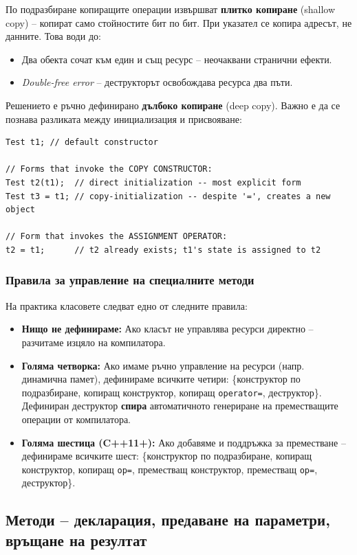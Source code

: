 \documentclass{scrartcl}
\begin{document}
\begin{FlushLeft}
По подразбиране копиращите операции извършват \textbf{плитко копиране} (shallow copy) -- копират само стойностите бит по бит. При указател се копира адресът, не данните. Това води до:
\begin{itemize}
    \item Два обекта сочат към един и същ ресурс -- неочаквани странични ефекти.
    \item \textit{Double-free error} -- деструкторът освобождава ресурса два пъти.
\end{itemize}

Решението е ръчно дефинирано \textbf{дълбоко копиране} (deep copy). Важно е да се познава разликата между инициализация и присвояване:

\begin{lstlisting}
Test t1; // default constructor

// Forms that invoke the COPY CONSTRUCTOR:
Test t2(t1);  // direct initialization -- most explicit form
Test t3 = t1; // copy-initialization -- despite '=', creates a new object

// Form that invokes the ASSIGNMENT OPERATOR:
t2 = t1;      // t2 already exists; t1's state is assigned to t2
\end{lstlisting}

\subsubsection{Правила за управление на специалните методи}

На практика класовете следват едно от следните правила:
\begin{itemize}
    \item \textbf{Нищо не дефинираме:} Ако класът не управлява ресурси директно -- разчитаме изцяло на компилатора.
    \item \textbf{Голяма четворка:} Ако имаме ръчно управление на ресурси (напр. динамична памет), дефинираме всичките четири: \{конструктор по подразбиране, копиращ конструктор, копиращ \texttt{operator=}, деструктор\}. Дефиниран деструктор \textbf{спира} автоматичното генериране на преместващите операции от компилатора.
    \item \textbf{Голяма шестица (C++11+):} Ако добавяме и поддръжка за преместване -- дефинираме всичките шест: \{конструктор по подразбиране, копиращ конструктор, копиращ \texttt{op=}, преместващ конструктор, преместващ \texttt{op=}, деструктор\}.
\end{itemize}

\subsection{Методи -- декларация, предаване на параметри, връщане на резултат}


\end{FlushLeft}
\end{document}
